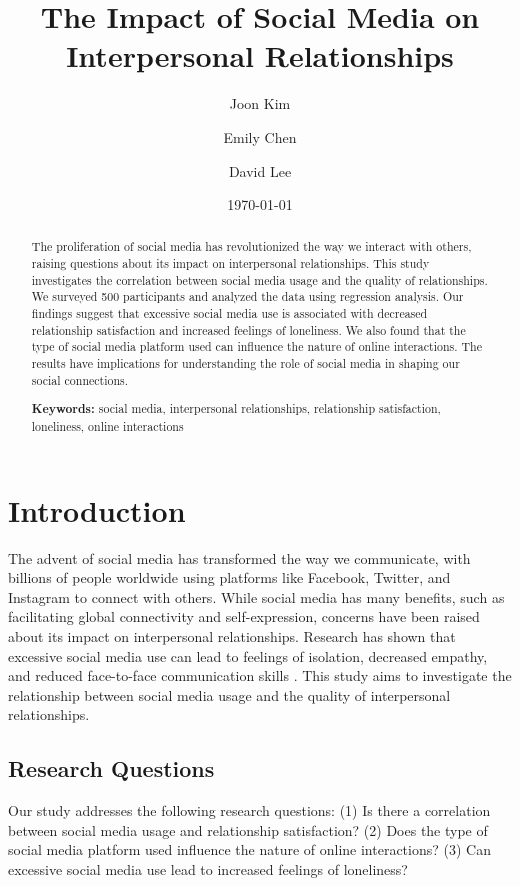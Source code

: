 \documentclass[12pt,a4paper]{article}
\title{The Impact of Social Media on Interpersonal Relationships}
\author{Joon Kim \and Emily Chen \and David Lee}
\date{\today}
\begin{document}
\maketitle
\thispagestyle{empty}

\begin{abstract}
\setlength{\parindent}{0pt}
The proliferation of social media has revolutionized the way we interact with others, raising questions about its impact on interpersonal relationships. This study investigates the correlation between social media usage and the quality of relationships. We surveyed 500 participants and analyzed the data using regression analysis. Our findings suggest that excessive social media use is associated with decreased relationship satisfaction and increased feelings of loneliness. We also found that the type of social media platform used can influence the nature of online interactions. The results have implications for understanding the role of social media in shaping our social connections.

\textbf{Keywords:} social media, interpersonal relationships, relationship satisfaction, loneliness, online interactions
\end{abstract}

\newpage
\tableofcontents
\newpage

\twocolumn
\section{Introduction}
The advent of social media has transformed the way we communicate, with billions of people worldwide using platforms like Facebook, Twitter, and Instagram to connect with others. While social media has many benefits, such as facilitating global connectivity and self-expression, concerns have been raised about its impact on interpersonal relationships. Research has shown that excessive social media use can lead to feelings of isolation, decreased empathy, and reduced face-to-face communication skills \citep{Kross2013}. This study aims to investigate the relationship between social media usage and the quality of interpersonal relationships.

\subsection{Research Questions}
Our study addresses the following research questions: (1) Is there a correlation between social media usage and relationship satisfaction? (2) Does the type of social media platform used influence the nature of online interactions? (3) Can excessive social media use lead to increased feelings of loneliness?
\end{document}
